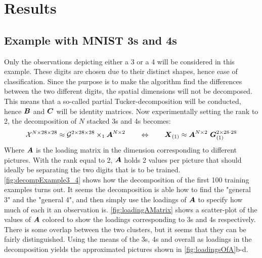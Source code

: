 \section{Results}
\subsection{Example with MNIST 3s and 4s}
Only the observations depicting either a 3 or a 4 will be considered in this example. These digits are chosen due to their distinct shapes, hence ease of classification. Since the purpose is to make the algorithm find the differences between the two different digits, the spatial dimensions will not be decomposed. This means that a so-called partial Tucker-decomposition will be conducted, hence $\boldsymbol{B}$ and $\boldsymbol{C}$ will be identity matrices. Now experimentally setting the rank to 2, the decomposition of $N$ stacked 3s and 4s becomes:
\begin{equation}
    \tensor{X}^{N\times 28\times 28} \approx \tensor{G}^{2 \times 28 \times 28} \times_1 \bs{A}^{N\times 2} \qquad \Leftrightarrow \qquad \bs{X}_{(1)} \approx \bs{A}^{N\times 2} \ \bs{G}^{2 \times 28\cdot 28}_{(1)}
\end{equation}
Where $\boldsymbol{A}$ is the loading matrix in the dimension corresponding to different pictures. With the rank equal to 2, $\boldsymbol{A}$ holds 2 values per picture that should ideally be separating the two digits that is to be trained. \autoref{fig:decompExample3_4} shows how the decomposition of the first 100 training examples turns out. It seems the decomposition is able how to find the "general 3" and the "general 4", and then simply use the loadings of $\boldsymbol{A}$ to specify how much of each it an observation is. \autoref{fig:loadingAMatrix} shows a scatter-plot of the values of $\boldsymbol{A}$ colored to show the loadings corresponding to 3s and 4s respectively. There is some overlap between the two clusters, but it seems that they can be fairly distinguished. Using the means of the 3s, 4s and overall as loadings in the decomposition yields the approximated pictures shown in \autoref{fig:loadingsOfA}b-d.

